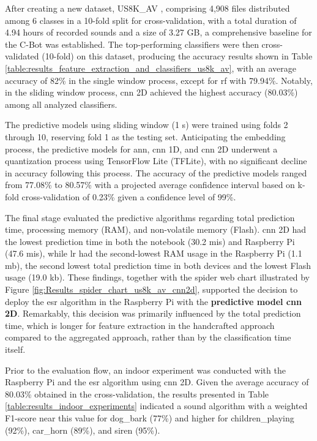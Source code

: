 After creating a new dataset, US8K\_AV \cite{florentino2024}, comprising 4,908 files distributed among 6 classes in a 10-fold split for cross-validation, with a total duration of 4.94 hours of recorded sounds and a size of 3.27 GB, a comprehensive baseline for the C-Bot was established. The top-performing classifiers were then cross-validated (10-fold) on this dataset, producing the accuracy results shown in Table \ref{table:results_feature_extraction_and_classifiers_us8k_av}, with an average accuracy of 82\% in the single window process, except for \gls{rf} with 79.94\%. Notably, in the sliding window process, \gls{cnn} 2D achieved the highest accuracy (80.03\%) among all analyzed classifiers.

The predictive models using sliding window (1 \gls{s}) were trained using folds 2 through 10, reserving fold 1 as the testing set. Anticipating the embedding process, the predictive models for \gls{ann}, \gls{cnn} 1D, and \gls{cnn} 2D underwent a quantization process using TensorFlow Lite (TFLite), with no significant decline in accuracy following this process. The accuracy of the predictive models ranged from 77.08\% to 80.57\% with a projected average
confidence interval based on k-fold cross-validation of 0.23\% given a confidence level of 99\%.

The final stage evaluated the predictive algorithms regarding total prediction time, processing memory (RAM), and non-volatile memory (Flash). \gls{cnn} 2D had the lowest prediction time in both the notebook (30.2 \gls{mi}\gls{s}) and Raspberry Pi (47.6 \gls{mi}\gls{s}), while \gls{lr} had the second-lowest RAM usage in the Raspberry Pi (1.1 \gls{m}\gls{b}), the second lowest total prediction time in both devices and the lowest Flash usage (19.0 \gls{k}\gls{b}). These findings, together with the spider web chart illustrated by Figure \ref{fig:Results_spider_chart_us8k_av_cnn2d}, supported the decision to deploy the \gls{esr} algorithm in the Raspberry Pi with the \textbf{predictive model \gls{cnn} 2D}. Remarkably, this decision was primarily influenced by the total prediction time, which is longer for feature extraction in the handcrafted approach compared to the aggregated approach, rather than by the classification time itself.

Prior to the evaluation flow, an indoor experiment was conducted with the Raspberry Pi and the \gls{esr} algorithm using \gls{cnn} 2D. Given the average accuracy of 80.03\% obtained in the cross-validation, the results presented in Table \ref{table:results_indoor_experiments} indicated a sound algorithm with a weighted F1-score near this value for dog\_bark (77\%) and higher for children\_playing (92\%), car\_horn (89\%), and siren (95\%).


